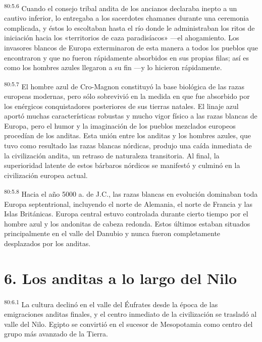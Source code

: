 \par
\textsuperscript{80:5.6} Cuando el consejo tribal andita de los ancianos declaraba inepto a un cautivo inferior, lo entregaba a los sacerdotes chamanes durante una ceremonia complicada, y éstos lo escoltaban hasta el río donde le administraban los ritos de iniciación hacia los «territorios de caza paradisíacos» ---el ahogamiento. Los invasores blancos de Europa exterminaron de esta manera a todos los pueblos que encontraron y que no fueron rápidamente absorbidos en sus propias filas; así es como los hombres azules llegaron a su fin ---y lo hicieron rápidamente.

\par
\textsuperscript{80:5.7} El hombre azul de Cro-Magnon constituyó la base biológica de las razas europeas modernas, pero sólo sobrevivió en la medida en que fue absorbido por los enérgicos conquistadores posteriores de sus tierras natales. El linaje azul aportó muchas características robustas y mucho vigor físico a las razas blancas de Europa, pero el humor y la imaginación de los pueblos mezclados europeos procedían de los anditas. Esta unión entre los anditas y los hombres azules, que tuvo como resultado las razas blancas nórdicas, produjo una caída inmediata de la civilización andita, un retraso de naturaleza transitoria. Al final, la superioridad latente de estos bárbaros nórdicos se manifestó y culminó en la civilización europea actual.

\par
\textsuperscript{80:5.8} Hacia el año 5000 a. de J.C., las razas blancas en evolución dominaban toda Europa septentrional, incluyendo el norte de Alemania, el norte de Francia y las Islas Británicas. Europa central estuvo controlada durante cierto tiempo por el hombre azul y los andonitas de cabeza redonda. Estos últimos estaban situados principalmente en el valle del Danubio y nunca fueron completamente desplazados por los anditas.

\section*{6. Los anditas a lo largo del Nilo}
\par
\textsuperscript{80:6.1} La cultura declinó en el valle del Éufrates desde la época de las emigraciones anditas finales, y el centro inmediato de la civilización se trasladó al valle del Nilo. Egipto se convirtió en el sucesor de Mesopotamia como centro del grupo más avanzado de la Tierra.

